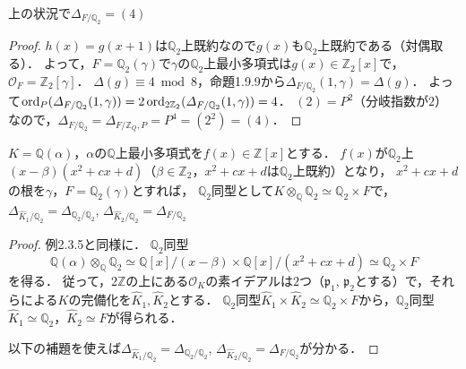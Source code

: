 \begin{screen}
  上の状況で$\varDelta_{F/\mathbb{Q}_2}=(4)$
\end{screen}
\begin{proof}
  $h(x)=g(x+1)$は$\mathbb{Q}_2$上既約なので$g(x)$も$\mathbb{Q}_2$上既約である（対偶取る）．
  よって，$F=\mathbb{Q}_2(\gamma)$で$\gamma$の$\mathbb{Q}_2$上最小多項式は$g(x)\in\mathbb{Z}_2[x]$で，$\mathcal{O}_F=\mathbb{Z}_2[\gamma]$．
  $\varDelta(g)\equiv4\bmod8$，命題1.9.9から$\varDelta_{F/\mathbb{Q}_2}(1, \gamma)=\varDelta(g)$．
  よって$\operatorname{ord}_P(\varDelta_{F/\mathbb{Q}_2}(1, \gamma)) = 2\operatorname{ord}_{2\mathbb{Z}_2}(\varDelta_{F/\mathbb{Q}_2}(1, \gamma)) = 4$．
  $(2)=P^2$（分岐指数が$2$）なので，$\varDelta_{F/\mathbb{Q}_2}=\varDelta_{F/\mathbb{Z}_Q, P}=P^4=(2^2)=(4)$．
\end{proof}

\begin{screen}
  $K=\mathbb{Q}(\alpha)$，$\alpha$の$\mathbb{Q}$上最小多項式を$f(x)\in\mathbb{Z}[x]$とする．
  $f(x)$が$\mathbb{Q}_2$上$(x-\beta)(x^2+cx+d)$（$\beta\in\mathbb{Z}_2$，$x^2+cx+d$は$\mathbb{Q}_2$上既約）となり，
  $x^2+cx+d$の根を$\gamma$，$F=\mathbb{Q}_2(\gamma)$とすれば，
  $\mathbb{Q}_2$同型として$K\otimes_\mathbb{Q}\mathbb{Q}_2\simeq\mathbb{Q}_2\times F$で，$\varDelta_{\widehat{K}_1/\mathbb{Q}_2}=\varDelta_{\mathbb{Q}_2/\mathbb{Q}_2}$, $\varDelta_{\widehat{K}_2/\mathbb{Q}_2}=\varDelta_{F/\mathbb{Q}_2}$
\end{screen}
\begin{proof}
  例2.3.5と同様に．
  $\mathbb{Q}_2$同型
  \[\mathbb{Q}(\alpha) \otimes_\mathbb{Q} \mathbb{Q}_2 \simeq \mathbb{Q}[x]/(x-\beta) \times \mathbb{Q}[x]/(x^2 + cx + d) \simeq \mathbb{Q}_2\times F\]
  を得る．
  従って，$2\mathbb{Z}$の上にある$\mathcal{O}_K$の素イデアルは$2$つ（$\mathfrak{p}_1$, $\mathfrak{p}_2$とする）で，それらによる$K$の完備化を$\widehat{K}_1, \widehat{K}_2$とする．
  $\mathbb{Q}_2$同型$\widehat{K}_1\times\widehat{K}_2\simeq\mathbb{Q}_2\times F$から，$\mathbb{Q}_2$同型$\widehat{K}_1\simeq\mathbb{Q}_2$，$\widehat{K}_2\simeq F$が得られる．

  以下の補題を使えば$\varDelta_{\widehat{K}_1/\mathbb{Q}_2}=\varDelta_{\mathbb{Q}_2/\mathbb{Q}_2}$, $\varDelta_{\widehat{K}_2/\mathbb{Q}_2}=\varDelta_{F/\mathbb{Q}_2}$が分かる．
\end{proof}

